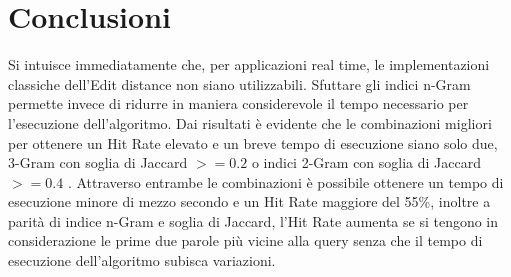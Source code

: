 \documentclass{article}
\begin{document}
\section{Conclusioni}
Si intuisce immediatamente che, per applicazioni real time, le implementazioni classiche dell'Edit distance non siano utilizzabili. Sfuttare gli indici n-Gram  permette invece di ridurre in maniera considerevole il tempo necessario per l'esecuzione dell'algoritmo. Dai risultati è evidente che le combinazioni migliori per ottenere un Hit Rate elevato e un breve tempo di esecuzione siano solo due, 3-Gram con soglia di Jaccard $>=0.2$ o indici 2-Gram con soglia di Jaccard $>=0.4$ . Attraverso entrambe le combinazioni è possibile ottenere un tempo di esecuzione minore di mezzo secondo e un Hit Rate maggiore del 55\%, inoltre a parità di indice n-Gram e soglia di Jaccard, l'Hit Rate aumenta se si tengono in considerazione le prime due parole più vicine alla query senza che il tempo di esecuzione dell'algoritmo subisca variazioni. 
\end{document}
